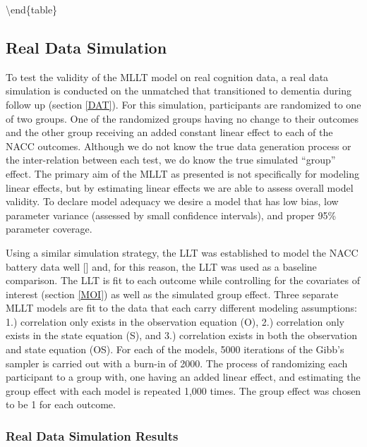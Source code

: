\documentclass[
]{article}
\begin{document}
\textbackslash end\{table\}

\raggedright

\hypertarget{real-data-simulation}{%
\subsection{Real Data Simulation}\label{real-data-simulation}}

To test the validity of the MLLT model on real cognition data, a real data simulation is conducted on the unmatched that transitioned to dementia during follow up (section \ref{DAT}). For this simulation, participants are randomized to one of two groups. One of the randomized groups having no change to their outcomes and the other group receiving an added constant linear effect to each of the NACC outcomes. Although we do not know the true data generation process or the inter-relation between each test, we do know the true simulated ``group'' effect. The primary aim of the MLLT as presented is not specifically for modeling linear effects, but by estimating linear effects we are able to assess overall model validity. To declare model adequacy we desire a model that has low bias, low parameter variance (assessed by small confidence intervals), and proper 95\% parameter coverage.

Using a similar simulation strategy, the LLT was established to model the NACC battery data well {[}{]} and, for this reason, the LLT was used as a baseline comparison. The LLT is fit to each outcome while controlling for the covariates of interest (section \ref{MOI}) as well as the simulated group effect. Three separate MLLT models are fit to the data that each carry different modeling assumptions: 1.) correlation only exists in the observation equation (O), 2.) correlation only exists in the state equation (S), and 3.) correlation exists in both the observation and state equation (OS). For each of the models, 5000 iterations of the Gibb's sampler is carried out with a burn-in of 2000. The process of randomizing each participant to a group with, one having an added linear effect, and estimating the group effect with each model is repeated 1,000 times. The group effect was chosen to be 1 for each outcome.

\hypertarget{real-data-simulation-results}{%
\subsubsection{Real Data Simulation Results}\label{real-data-simulation-results}}
\end{document}

